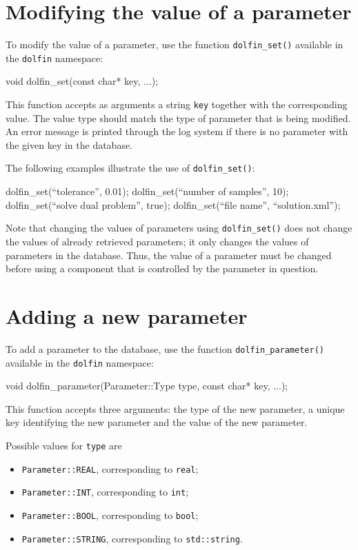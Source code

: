 \section{Modifying the value of a parameter}

To modify the value of a parameter, use the function \texttt{dolfin\_set()}
available in the \texttt{dolfin} namespace:
\begin{code}
  void dolfin_set(const char* key, ...);
\end{code}
This function accepts as arguments a string \texttt{key} together with
the corresponding value. The value type should match the type of
parameter that is being modified. An error message is
printed through the log system if there is no parameter with the given
key in the database.

The following examples illustrate
the use of \texttt{dolfin\_set()}:
\begin{code}
  dolfin_set(``tolerance'', 0.01);
  dolfin_set(``number of samples'', 10);
  dolfin_set(``solve dual problem'', true);
  dolfin_set(``file name'', ``solution.xml'');
\end{code}

Note that changing the values of parameters using
\texttt{dolfin\_set()} does not change the values of already retrieved
parameters; it only changes the values of parameters in the
database. Thus, the value of a parameter must be changed before using
a component that is controlled by the parameter in question.

\section{Adding a new parameter}

To add a parameter to the database, use the function
\texttt{dolfin\_parameter()} available in the \texttt{dolfin}
namespace:
\begin{code}
  void dolfin_parameter(Parameter::Type type, 
                        const char* key, ...);
\end{code}
This function accepts three arguments: the type of the new parameter,
a unique key identifying the new parameter and the value of the new
parameter.

Possible values for \texttt{type} are
\begin{itemize}
\item
  \texttt{Parameter::REAL}, corresponding to \texttt{real};
\item
  \texttt{Parameter::INT}, corresponding to \texttt{int};
\item
  \texttt{Parameter::BOOL}, corresponding to \texttt{bool};
\item
  \texttt{Parameter::STRING}, corresponding to \texttt{std::string}.
\end{itemize}

